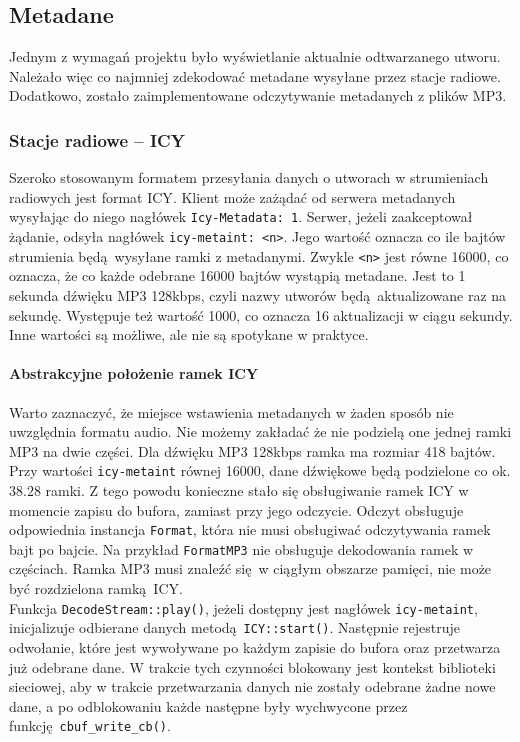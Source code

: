 \documentclass[polish]{aghengthesis}
\begin{document}
		\subsection{Metadane}
		Jednym z wymagań projektu było wyświetlanie aktualnie odtwarzanego utworu. Należało więc co najmniej zdekodować metadane wysyłane przez stacje radiowe. Dodatkowo, zostało zaimplementowane odczytywanie metadanych z plików MP3.
		
		\subsubsection{Stacje radiowe -- ICY}
			Szeroko stosowanym formatem przesyłania danych o utworach w strumieniach radiowych jest format ICY\textsuperscript{\cite{icy_spec}}. Klient może zażądać od serwera metadanych wysyłając do niego nagłówek \lstinline|Icy-Metadata: 1|. Serwer, jeżeli zaakceptował żądanie, odsyła nagłówek \lstinline|icy-metaint: <n>|. Jego wartość oznacza co ile bajtów strumienia będą wysyłane ramki z metadanymi. Zwykle \lstinline|<n>| jest równe 16000, co oznacza, że co każde odebrane 16000 bajtów wystąpią metadane. Jest to 1 sekunda dźwięku MP3 128kbps, czyli nazwy utworów będą aktualizowane raz na sekundę. Występuje też wartość 1000, co oznacza 16 aktualizacji w ciągu sekundy. Inne wartości są możliwe, ale nie są spotykane w praktyce.
			
			\paragraph{Abstrakcyjne położenie ramek ICY}
				Warto zaznaczyć, że miejsce wstawienia metadanych w żaden sposób nie uwzględnia formatu audio. Nie możemy zakładać że nie podzielą one jednej ramki MP3 na dwie części. Dla dźwięku MP3 128kbps ramka ma rozmiar 418 bajtów. Przy wartości \lstinline|icy-metaint| równej 16000, dane dźwiękowe będą podzielone co ok. $38.28$ ramki. Z tego powodu konieczne stało się obsługiwanie ramek ICY w momencie zapisu do bufora, zamiast przy jego odczycie. Odczyt obsługuje odpowiednia instancja \lstinline|Format|, która nie musi obsługiwać odczytywania ramek bajt po bajcie. Na przykład \lstinline|FormatMP3| nie obsługuje dekodowania ramek w częściach. Ramka MP3 musi znaleźć się w ciągłym obszarze pamięci, nie może być rozdzielona ramką ICY.
			$ $\\
			
			Funkcja \lstinline|DecodeStream::play()|, jeżeli dostępny jest nagłówek \lstinline|icy-metaint|, inicjalizuje odbierane danych metodą \lstinline|ICY::start()|. Następnie rejestruje odwołanie, które jest wywoływane po każdym zapisie do bufora oraz przetwarza już odebrane dane. W trakcie tych czynności blokowany jest kontekst biblioteki sieciowej, aby w trakcie przetwarzania danych nie zostały odebrane żadne nowe dane, a po odblokowaniu każde następne były wychwycone przez funkcję \lstinline|cbuf_write_cb()|.
			
\end{document}
